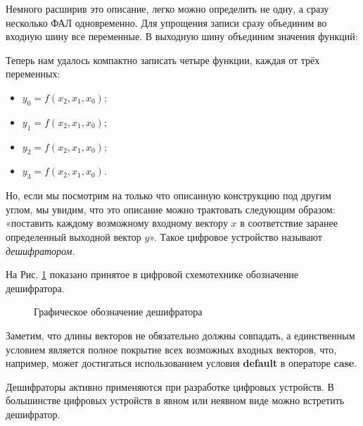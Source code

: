 \documentclass[a5paper, DIV=14, headings=openany, twoside=true,fontsize=10pt, titlepage]{scrreprt}
\newcommand{\quotes}[1]{«#1»}
\newcommand{\eng}[1]{\foreignlanguage{english}{#1}}
\newcommand{\kword}[1]{\eng{\textbf{#1}}}
\begin{document}
\par{Немного расширив это описание, легко можно определить не одну, а сразу несколько ФАЛ одновременно. Для упрощения записи сразу объединим во входную шину все переменные. В выходную шину объединим значения функций:}

  

\par{Теперь нам удалось компактно записать четыре функции, каждая от трёх переменных:
\begin{itemize}[noitemsep,topsep=2pt,label={}]
  \item $y_0=f(x_2,x_1,x_0);$
  \item $y_1=f(x_2,x_1,x_0);$
  \item $y_2=f(x_2,x_1,x_0);$
  \item $y_3=f(x_2,x_1,x_0).$
\end{itemize}}

\par{Но, если мы посмотрим на только что описанную конструкцию под другим углом, мы увидим, что это описание можно трактовать следующим образом: \quotes{поставить каждому возможному входному вектору $x$ в соответствие заранее определенный выходной вектор $y$}. Такое цифровое устройство называют \emph{дешифратором}.}

\par{На Рис. \ref{fig:decoder} показано принятое в цифровой схемотехнике обозначение дешифратора.}

\begin{figure}[H]
\centering
\def\svgwidth{\columnwidth}

\caption{Графическое обозначение дешифратора}
\label{fig:decoder}
\end{figure}

\par{Заметим, что длины векторов не обязательно должны совпадать, а единственным условием является полное покрытие всех возможных входных векторов, что, например, может достигаться использованием условия \kword{default} в операторе \kword{case}.}

\par{Дешифраторы активно применяются при разработке цифровых устройств. В большинстве цифровых устройств в явном или неявном виде можно встретить дешифратор.}
\end{document}
